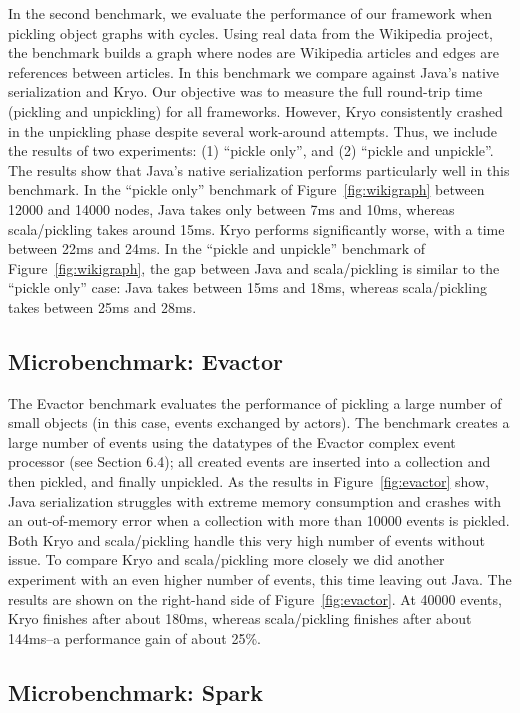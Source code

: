In the second benchmark, we evaluate the performance of our framework when
pickling object graphs with cycles. Using real data from the Wikipedia
project, the benchmark builds a graph where nodes are Wikipedia articles and
edges are references between articles. In this benchmark we compare against
Java's native serialization and Kryo. Our objective was to measure the full
round-trip time (pickling and unpickling) for all frameworks. However, Kryo
consistently crashed in the unpickling phase despite several work-around
attempts. Thus, we include the results of two experiments: (1) ``pickle
only'', and (2) ``pickle and unpickle''. The results show that Java's native
serialization performs particularly well in this benchmark. In the ``pickle
only'' benchmark of Figure~\ref{fig:wikigraph} between 12000 and 14000 nodes, Java takes only between 7ms and
10ms, whereas scala/pickling takes around 15ms. Kryo performs significantly
worse, with a time between 22ms and 24ms. In the ``pickle and unpickle''
benchmark of Figure~\ref{fig:wikigraph}, the gap between Java and scala/pickling is similar to the ``pickle
only'' case: Java takes between 15ms and 18ms, whereas scala/pickling takes
between 25ms and 28ms.

\subsection{Microbenchmark: Evactor}

The Evactor benchmark evaluates the performance of pickling a large number of
small objects (in this case, events exchanged by actors). The benchmark
creates a large number of events using the datatypes of the Evactor complex
event processor  (see Section 6.4); all created events are inserted into a
collection and then pickled, and finally unpickled. As the results in
Figure~\ref{fig:evactor} show, Java serialization struggles with extreme memory
consumption and crashes with an out-of-memory error when a collection with
more than 10000 events is pickled. Both Kryo and scala/pickling handle this
very high number of events without issue. To compare Kryo and scala/pickling
more closely we did another experiment with an even higher number of events,
this time leaving out Java. The results are shown on the right-hand side of
Figure~\ref{fig:evactor}. At 40000 events, Kryo finishes after about 180ms, whereas
scala/pickling finishes after about 144ms--a performance gain of about 25\%.

\subsection{Microbenchmark: Spark}

